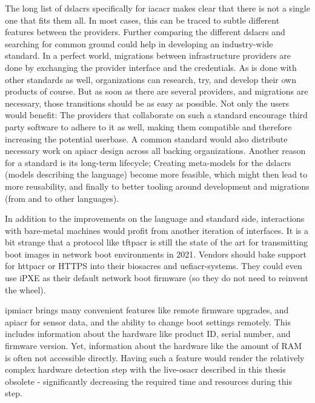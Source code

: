 The long list of \gls{dslacr}s specifically for \gls{iacacr} makes clear that there is not a single one that fits them all. In most cases, this can be traced to subtle different features between the providers. Further comparing the different \gls{dslacr}s and searching for common ground could help in developing an industry-wide standard. In a perfect world, migrations between infrastructure providers are done by exchanging the provider interface and the credentials. As is done with other standards as well, organizations can research, try, and develop their own products of course. But as soon as there are several providers, and migrations are necessary, those transitions should be as easy as possible. Not only the users would benefit: The providers that collaborate on such a standard encourage third party software to adhere to it as well, making them compatible and therefore increasing the potential userbase. A common standard would also distribute necessary work on \gls{apiacr} design across all backing organizations. Another reason for a standard is its long-term lifecycle; Creating meta-models for the \gls{dslacr}s (models describing the language) become more feasible, which might then lead to more reusability, and finally to better tooling around development and migrations (from and to other languages).


In addition to the improvements on the language and standard side, interactions with bare-metal machines would profit from another iteration of interfaces. It is a bit strange that a protocol like \gls{tftpacr} is still the state of the art for transmitting boot images in network boot environments in 2021. Vendors should bake support for \gls{httpacr} or HTTPS into their \gls{biosacr}es and \gls{uefiacr}-systems. They could even use iPXE as their default network boot firmware (so they do not need to reinvent the wheel).

\Gls{ipmiacr} brings many convenient features like remote firmware upgrades, and \gls{apiacr} for sensor data, and the ability to change boot settings remotely. This includes information about the hardware like product ID, serial number, and firmware version. Yet, information about the hardware like the amount of RAM is often not accessible directly. Having such a feature would render the relatively complex hardware detection step with the live-\gls{osacr} described in this thesis obsolete - significantly decreasing the required time and resources during this step.

